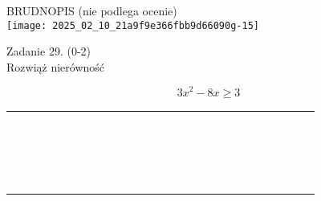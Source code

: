 \documentclass[10pt]{article}
\begin{document}
BRUDNOPIS (nie podlega ocenie)\\
\texttt{[image: 2025\_02\_10\_21a9f9e366fbb9d66090g-15]}

Zadanie 29. (0-2)\\
Rozwiąż nierówność

\[
3 x^{2}-8 x \geq 3
\]

\begin{center}
\begin{tabular}{|c|c|c|c|c|c|c|c|c|c|c|c|c|c|c|c|c|c|c|c|c|c|c|c|}
\hline
 &  &  &  &  &  &  &  &  &  &  &  &  &  &  &  &  &  &  &  &  &  &  &  \\
\hline
 &  &  &  &  &  &  &  &  &  &  &  &  &  &  &  &  &  &  &  &  &  &  &  \\
\hline
 &  &  &  &  &  &  &  &  &  &  &  &  &  &  &  &  &  &  &  &  &  &  &  \\
\hline
 &  &  &  &  &  &  &  &  &  &  &  &  &  &  &  &  &  &  &  &  &  &  &  \\
\hline
 &  &  &  &  &  &  &  &  &  &  &  &  &  &  &  &  &  &  &  &  &  &  &  \\
\hline
 &  &  &  &  &  &  &  &  &  &  &  &  &  &  &  &  &  &  &  &  &  &  &  \\
\hline
 &  &  &  &  &  &  &  &  &  &  &  &  &  &  &  &  &  &  &  &  &  &  &  \\
\hline
 &  &  &  &  &  &  &  &  &  &  &  &  &  &  &  &  &  &  &  &  &  &  &  \\
\hline
 &  &  &  &  &  &  &  &  &  &  &  &  &  &  &  &  &  &  &  &  &  &  &  \\
\hline
 &  &  &  &  &  &  &  &  &  &  &  &  &  &  &  &  &  &  &  &  &  &  &  \\
\hline
 &  &  &  &  &  &  &  &  &  &  &  &  &  &  &  &  &  &  &  &  &  &  &  \\
\hline
 &  &  &  &  &  &  &  &  &  &  &  &  &  &  &  &  &  &  &  &  &  &  &  \\
\hline
 &  &  &  &  &  &  &  &  &  &  &  &  &  &  &  &  &  &  &  &  &  &  &  \\
\hline
 &  &  &  &  &  &  &  &  &  &  &  &  &  &  &  &  &  &  &  &  &  &  &  \\
\hline
 &  &  &  &  &  &  &  &  &  &  &  &  &  &  &  &  &  &  &  &  &  &  &  \\
\hline
 &  &  &  &  &  &  &  &  &  &  &  &  &  &  &  &  &  &  &  &  &  &  &  \\
\hline
 &  &  &  &  &  &  &  &  &  &  &  &  &  &  &  &  &  &  &  &  &  &  &  \\
\hline
 &  &  &  &  &  &  &  &  &  &  &  &  &  &  &  &  &  &  &  &  &  &  &  \\

\end{tabular}
\end{center}
\end{document}
